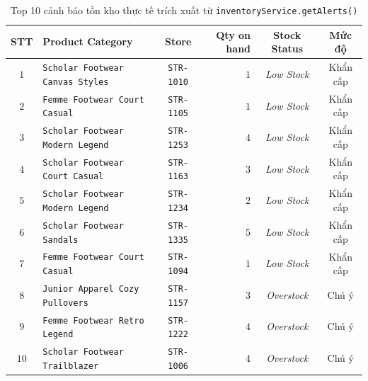\begin{table}[H]
	\centering
	\footnotesize
	\begin{tabular}{c p{6cm} c r c c}
		\toprule
		\textbf{STT} & \textbf{Product Category}                         & \textbf{Store}    & \textbf{Qty on hand} & \textbf{Stock Status} & \textbf{Mức độ} \\
		\midrule
		$1$          & \texttt{Scholar Footwear Canvas Styles} & \texttt{STR-1010} & $1$                  & \textit{Low Stock}    & Khẩn cấp        \\
		$2$          & \texttt{Femme Footwear Court Casual}    & \texttt{STR-1105} & $1$                  & \textit{Low Stock}    & Khẩn cấp        \\
		$3$          & \texttt{Scholar Footwear Modern Legend} & \texttt{STR-1253} & $4$                  & \textit{Low Stock}    & Khẩn cấp        \\
		$4$          & \texttt{Scholar Footwear Court Casual}  & \texttt{STR-1163} & $3$                  & \textit{Low Stock}    & Khẩn cấp        \\
		$5$          & \texttt{Scholar Footwear Modern Legend} & \texttt{STR-1234} & $2$                  & \textit{Low Stock}    & Khẩn cấp        \\
		$6$          & \texttt{Scholar Footwear Sandals}       & \texttt{STR-1335} & $5$                  & \textit{Low Stock}    & Khẩn cấp        \\
		$7$          & \texttt{Femme Footwear Court Casual}    & \texttt{STR-1094} & $1$                  & \textit{Low Stock}    & Khẩn cấp        \\
		$8$          & \texttt{Junior Apparel Cozy Pullovers}  & \texttt{STR-1157} & $3$                  & \textit{Overstock}    & Chú ý           \\
		$9$          & \texttt{Femme Footwear Retro Legend}    & \texttt{STR-1222} & $4$                  & \textit{Overstock}    & Chú ý           \\
		$10$         & \texttt{Scholar Footwear Trailblazer}   & \texttt{STR-1006} & $4$                  & \textit{Overstock}    & Chú ý           \\
		\bottomrule
	\end{tabular}
	\caption{Top 10 cảnh báo tồn kho thực tế trích xuất từ \texttt{inventoryService.getAlerts()}}
	\label{tab:top10-alerts}
\end{table}

